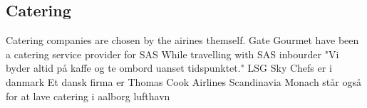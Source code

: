 \subsection{Catering} 
Catering companies are chosen by the airines themself.
Gate Gourmet have been a catering service provider for SAS
While travelling with SAS inbourder "Vi byder altid på kaffe og te ombord uanset tidspunktet."
LSG Sky Chefs er i danmark
Et dansk firma er Thomas Cook Airlines Scandinavia
Monach står også for at lave catering i aalborg lufthavn